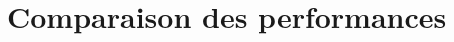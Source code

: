 \documentclass[a4paper,12pt]{article}
\begin{document}
  \begin{titlepage}
   \def\titletype{Rapport de tests}
   
  \end{titlepage}

  
  \clearpage

  \tableofcontents
  

  \clearpage
  
  \renewcommand{\labelitemi}{$\bullet$}
  \renewcommand{\labelitemii}{$\circ$}
  \renewcommand{\labelitemiii}{$\diamond$}
  \renewcommand{\labelitemiv}{$\ast$}
  
  \section{Comparaison des performances}
\end{document}

